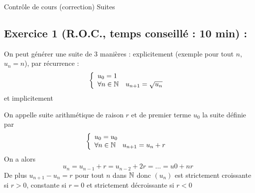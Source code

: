 

\usepackage{tcolorbox}




\center
\Large Contrôle de cours (correction)
\flushleft
\center
Suites
\flushleft \normalsize
\subsection*{Exercice 1 (R.O.C., temps conseillé : 10 min) : }
On peut générer une suite de 3 manières : explicitement (exemple pour tout $n$, $u_n = n$), par récurrence : $$\left\{\begin{array}{l} u_0 = 1 \\ \forall n \in \mathbb{N} \quad u_{n+1} = \sqrt{u_n}\end{array}\right.$$ et implicitement

On appelle suite arithmétique de raison $r$ et de premier terme $u_0$ la suite définie par $$\left\{\begin{array}{l} u_0 = u_0 \\ \forall n \in \mathbb{N} \quad u_{n+1} = u_n + r\end{array}\right.$$On a alors $$u_n = u_{n-1} + r = u_{n-2} + 2r = \ldots = u0 + nr$$ De plus $u_{n+1} -u_n = r$ pour tout $n$ dans $\mathbb{N}$ donc $(u_n)$ est strictement croissante si $r>0$, constante si $r=0$ et strictement décroissante si $r< 0$
